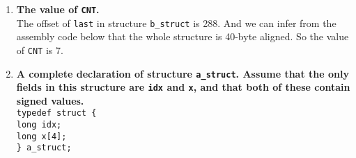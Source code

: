 \documentclass{article}
\begin{document}
\begin{enumerate}[label=\textbf{\Alph*.}]
	\item \textbf{The value of \texttt{CNT}.} \\
	The offset of \texttt{last} in structure \texttt{b\_struct} is 288. And we can
	infer from the assembly code below that the whole structure is 40-byte aligned.
	So the value of \texttt{CNT} is 7.
	\item \textbf{A complete declaration of structure \texttt{a\_struct}. Assume that the only
	fields in this structure are \texttt{idx} and \texttt{x}, and that both of these
	contain signed values.} \\
	\texttt{typedef struct \{ \\
		long idx; \\
		long x[4]; \\
	\} a\_struct;}
\end{enumerate}
\end{document}
